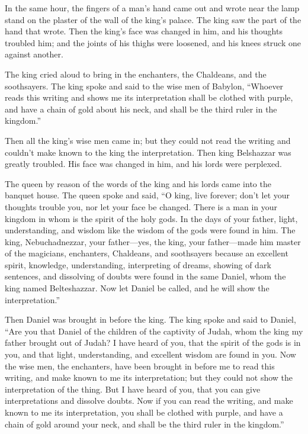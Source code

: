  In the same hour, the fingers of a man's hand came out and
wrote near the lamp stand on the plaster of the wall of the king's
palace. The king saw the part of the hand that wrote.  Then
the king's face was changed in him, and his thoughts troubled him; and
the joints of his thighs were loosened, and his knees struck one against
another.

 The king cried aloud to bring in the enchanters, the
Chaldeans, and the soothsayers. The king spoke and said to the wise men
of Babylon, ``Whoever reads this writing and shows me its interpretation
shall be clothed with purple, and have a chain of gold about his neck,
and shall be the third ruler in the kingdom.''

 Then all the king's wise men came in; but they could not
read the writing and couldn't make known to the king the interpretation.
 Then king Belshazzar was greatly troubled. His face was
changed in him, and his lords were perplexed.

 The queen by reason of the words of the king and his lords
came into the banquet house. The queen spoke and said, ``O king, live
forever; don't let your thoughts trouble you, nor let your face be
changed.  There is a man in your kingdom in whom is the
spirit of the holy gods. In the days of your father, light,
understanding, and wisdom like the wisdom of the gods were found in him.
The king, Nebuchadnezzar, your father---yes, the king, your
father---made him master of the magicians, enchanters, Chaldeans, and
soothsayers  because an excellent spirit, knowledge,
understanding, interpreting of dreams, showing of dark sentences, and
dissolving of doubts were found in the same Daniel, whom the king named
Belteshazzar. Now let Daniel be called, and he will show the
interpretation.''

 Then Daniel was brought in before the king. The king spoke
and said to Daniel, ``Are you that Daniel of the children of the
captivity of Judah, whom the king my father brought out of Judah?
 I have heard of you, that the spirit of the gods is in
you, and that light, understanding, and excellent wisdom are found in
you.  Now the wise men, the enchanters, have been brought
in before me to read this writing, and make known to me its
interpretation; but they could not show the interpretation of the thing.
 But I have heard of you, that you can give interpretations
and dissolve doubts. Now if you can read the writing, and make known to
me its interpretation, you shall be clothed with purple, and have a
chain of gold around your neck, and shall be the third ruler in the
kingdom.''

